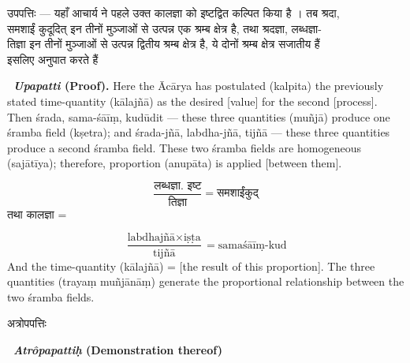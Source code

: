 \documentclass[11pt,a4paper]{article}
\newcommand{\dev}[1]{{\devanagarifont #1}}
\newcommand{\bilingualpair}[2]{%
  \noindent%
  \begin{minipage}[t]{0.48\textwidth}
    #1%
  \end{minipage}%
  \hfill%
  \begin{minipage}[t]{0.48\textwidth}
    #2%
  \end{minipage}%
  \par\vspace{0.5em}%
}
\newenvironment{sanskritcol}{\devanagarifont\small}{}
\newenvironment{englishcol}{\iastfont\small}{}
\begin{document}
\vspace{0.5cm}
\bilingualpair{%
\begin{sanskritcol}
\dev{उपपत्तिः --- यहाँ आचार्य ने पहले उक्त कालज्ञा को इष्टद्वित कल्पित किया है । तब श्रदा,}\\[0.3em]
\dev{समशाईं कुदूदित् इन तीनों मुञ्जाओं से उत्पन्न एक श्रम्ब क्षेत्र है, तथा श्रदज्ञा, लब्धज्ञा-}\\[0.3em]
\dev{तिज्ञा इन तीनों मुञ्जाओं से उत्पन्न द्वितीय श्रम्ब क्षेत्र है, ये दोनों श्रम्ब क्षेत्र सजातीय हैं}\\[0.3em]
\dev{इसलिए अनुपात करते हैं}
\end{sanskritcol}%
}{%
\begin{englishcol}
\textbf{\textbar\ \textit{Upapatti} (Proof).} Here the Ācārya has postulated (kalpita) the previously stated time-\-quantity (kālajñā) as the desired [value] for the second [process]. Then \'srada, sama-\'sāīṃ, kudūdit --- these three quantities (muñjā) produce one \'sramba field (kṣetra); and \'srada-\-jñā, labdha-\-jñā, tijñā --- these three quantities produce a second \'sramba field. These two \'sramba fields are homogeneous (sajātīya); therefore, proportion (anupāta) is applied [between them].
\end{englishcol}%
}

\bilingualpair{%
\begin{sanskritcol}
\begin{equation*}
\frac{\text{लब्धज्ञा. इष्ट}}{\text{तिज्ञा}} = \text{समशाईंकुद्}
\end{equation*}
\dev{तथा कालज्ञा =}
\end{sanskritcol}%
}{%
\begin{englishcol}
\begin{equation*}
\frac{\text{labdhajñā} \times \text{iṣṭa}}{\text{tijñā}} = \text{sama\'sāīṃ-kud}
\end{equation*}
And the time-\-quantity (kālajñā) = [the result of this proportion]. The three quantities (trayaṃ muñjānāṃ) generate the proportional relationship between the two \'sramba fields.
\end{englishcol}%
}

\vspace{0.5cm}
\bilingualpair{%
\begin{sanskritcol}
\dev{अत्रोपपत्तिः}
\end{sanskritcol}%
}{%
\begin{englishcol}
\textbf{\textbar\ \textit{Atrôpapattiḥ} (Demonstration thereof)}
\end{englishcol}%
}
\end{document}
